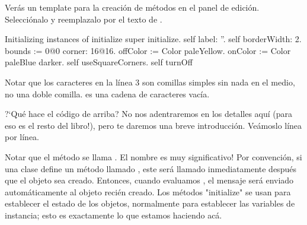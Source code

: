 \documentclass[a4paper,10pt,twoside]{book}
\begin{document}
Ver\'as un template para la creaci\'on de m\'etodos en el panel de edici\'on.
Selecci\'onalo y reemplazalo por el texto de .


\begin{numMethod}[scbecellinitialize]{Initializing instances of }
initialize
   super initialize.
   self label: ''.
   self borderWidth: 2.
   bounds := 0@0 corner: 16@16.
   offColor := Color paleYellow.
   onColor := Color paleBlue darker.
   self useSquareCorners.
   self turnOff
\end{numMethod}


\noindent
Notar que los caracteres  en la l\'inea 3 son comillas simples sin nada en el medio, no una doble comilla.  es una cadena de caracteres vac\'ia. 




?`Qu\'e hace el c\'odigo de arriba? No nos adentraremos en los detalles aqu\'i (para eso es el resto del libro!), pero te daremos una breve introducci\'on. Ve\'amoslo l\'inea por l\'inea.


Notar que el m\'etodo se llama .
El nombre es muy significativo!
Por convenci\'on, si una clase define un m\'etodo llamado , este ser\'a llamado inmediatamente despu\'es que el objeto sea creado. 
Entonces, cuando evaluamos , el mensaje  ser\'a enviado autom\'aticamente al objeto reci\'en creado. 
Los m\'etodos "initialize" se usan para establecer el estado de los objetos, normalmente para establecer las variables de instancia; esto es exactamente lo que estamos haciendo ac\'a. 
\end{document}
